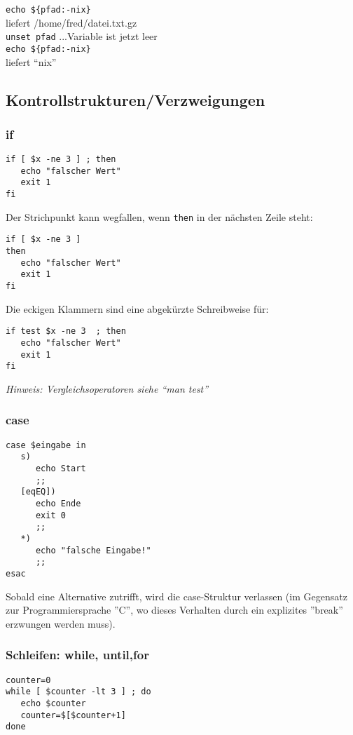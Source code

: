\documentclass[11pt]{article}
\begin{document}
\texttt{echo \$\{pfad:-nix\}}\\
liefert /home/fred/datei.txt.gz\\
\texttt{unset pfad} ...Variable ist jetzt leer\\
\texttt{echo \$\{pfad:-nix\}}\\
liefert ``nix''


\subsection{Kontrollstrukturen/Verzweigungen}
\subsubsection{if}
\begin{verbatim}
if [ $x -ne 3 ] ; then
   echo "falscher Wert"
   exit 1
fi
\end{verbatim}

Der Strichpunkt kann wegfallen, wenn \texttt{then} in der nächsten Zeile steht:
\begin{verbatim}
if [ $x -ne 3 ] 
then
   echo "falscher Wert"
   exit 1
fi
\end{verbatim}

Die eckigen Klammern sind eine abgekürzte Schreibweise für:

\begin{verbatim}
if test $x -ne 3  ; then
   echo "falscher Wert"
   exit 1
fi
\end{verbatim}

\textit{Hinweis: Vergleichsoperatoren siehe ``man test''}

\subsubsection{case}
\begin{verbatim}
case $eingabe in
   s)
      echo Start
      ;;
   [eqEQ])
      echo Ende
      exit 0
      ;;
   *)
      echo "falsche Eingabe!"
      ;;
esac
\end{verbatim}
Sobald eine Alternative zutrifft, wird die case-Struktur verlassen (im
Gegensatz zur Programmiersprache ''C'', wo dieses Verhalten durch ein
explizites ''break'' erzwungen werden muss).


\subsubsection{Schleifen: while, until,for}
\begin{verbatim}
counter=0
while [ $counter -lt 3 ] ; do
   echo $counter
   counter=$[$counter+1]
done
\end{verbatim}
\end{document}
